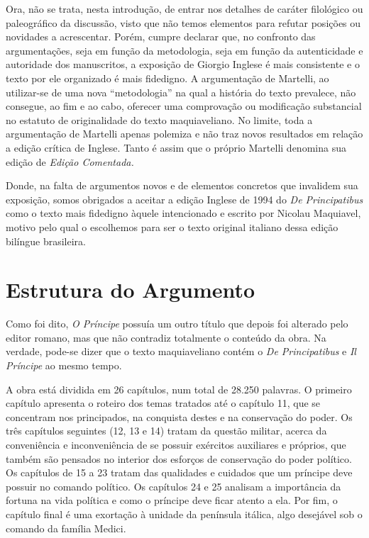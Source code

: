 Ora, não se trata, nesta introdução, de entrar nos detalhes de caráter
filológico ou paleográfico da discussão, visto que não temos elementos
para refutar posições ou novidades a acrescentar. Porém, cumpre declarar
que, no confronto das argumentações, seja em função da metodologia, seja
em função da autenticidade e autoridade dos manuscritos, a exposição de
Giorgio Inglese é mais consistente e o texto por ele organizado é mais
fidedigno. A argumentação de Martelli, ao utilizar-se de uma nova
``metodologia'' na qual a história do texto prevalece, não consegue, ao
fim e ao cabo, oferecer uma comprovação ou modificação substancial no
estatuto de originalidade do texto maquiaveliano. No limite, toda a
argumentação de Martelli apenas polemiza e não traz novos resultados em
relação a edição crítica de Inglese. Tanto é assim que o próprio
Martelli denomina sua edição de \emph{Edição Comentada.}

Donde, na falta de argumentos novos e de elementos concretos que
invalidem sua exposição, somos obrigados a aceitar a edição Inglese de
1994 do \emph{De Principatibus} como o texto mais fidedigno àquele
intencionado e escrito por Nicolau Maquiavel, motivo pelo qual o
escolhemos para ser o texto original italiano dessa edição bilíngue
brasileira.

\section{Estrutura do Argumento}

Como foi dito, \emph{O Príncipe} possuía um outro título que depois foi
alterado pelo editor romano, mas que não contradiz totalmente o conteúdo
da obra. Na verdade, pode-se dizer que o texto maquiaveliano contém o
\emph{De Principatibus} e \emph{Il Príncipe} ao mesmo tempo.

A obra está dividida em 26 capítulos, num total de 28.250 palavras. O
primeiro capítulo apresenta o roteiro dos temas tratados até o capítulo
11, que se concentram nos principados, na conquista destes e na
conservação do poder. Os três capítulos seguintes (12, 13 e 14) tratam
da questão militar, acerca da conveniência e inconveniência de se
possuir exércitos auxiliares e próprios, que também são pensados no
interior dos esforços de conservação do poder político. Os capítulos de
15 a 23 tratam das qualidades e cuidados que um príncipe deve possuir no
comando político. Os capítulos 24 e 25 analisam a importância da fortuna
na vida política e como o príncipe deve ficar atento a ela. Por fim, o
capítulo final é uma exortação à unidade da península itálica, algo
desejável sob o comando da família Medici.

